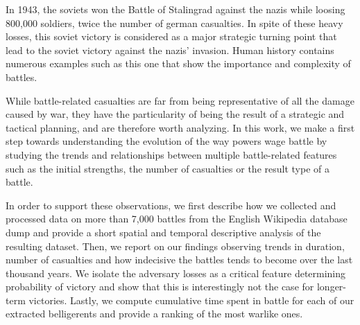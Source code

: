 In 1943, the soviets won the Battle of Stalingrad against the nazis while loosing 800,000 soldiers, twice the number of german casualties. In spite of these heavy losses, this soviet victory is considered as a major strategic turning point that lead to the soviet victory against the nazis' invasion. Human history contains numerous examples such as this one that show the importance and complexity of battles.

While battle-related casualties are far from being representative of all the damage caused by war, they have the particularity of being the result of a strategic and tactical planning, and are therefore worth analyzing. In this work, we make a first step towards understanding the evolution of the way powers wage battle by studying the trends and relationships between multiple battle-related features such as the initial strengths, the number of casualties or the result type of a battle. 

In order to support these observations, we first describe how we collected and processed data on more than 7,000 battles from the English Wikipedia database dump\cite{wikipedia_dump} and provide a short spatial and temporal descriptive analysis of the resulting dataset. Then, we report on our findings observing trends in duration, number of casualties and how indecisive the battles tends to become over the last thousand years. We isolate the adversary losses as a critical feature determining probability of victory and show that this is interestingly not the case for longer-term victories. Lastly, we compute cumulative time spent in battle for each of our extracted belligerents and provide a ranking of the most warlike ones.  
